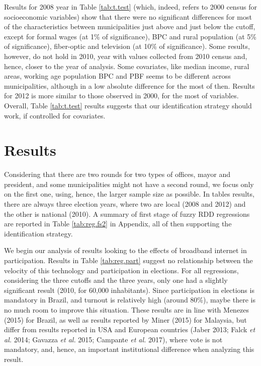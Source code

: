 \documentclass[
  12pt,
]{article}
\begin{document}
Results for 2008 year in Table \ref{tab:t.test} (which, indeed, refers
to 2000 census for socioeconomic variables) show that there were no
significant differences for most of the characteristics between
municipalities just above and just below the cutoff, except for formal
wages (at 1\% of significance), BPC and rural population (at 5\% of
significance), fiber-optic and television (at 10\% of significance).
Some results, however, do not hold in 2010, year with values collected
from 2010 census and, hence, closer to the year of analysis. Some
covariates, like median income, rural areas, working age population BPC
and PBF seems to be different across municipalities, although in a low
absolute difference for the most of then. Results for 2012 is more
similar to those observed in 2000, for the most of variables. Overall,
Table \ref{tab:t.test} results suggests that our identification strategy
should work, if controlled for covariates.

\hypertarget{results}{%
\section{Results}\label{results}}

Considering that there are two rounds for two types of offices, mayor
and president, and some municipalities might not have a second round, we
focus only on the first one, using, hence, the larger sample size as
possible. In tables results, there are always three election years,
where two are local (2008 and 2012) and the other is national (2010). A
summary of first stage of fuzzy RDD regressions are reported in Table
\ref{tab:reg.fs2} in Appendix, all of then supporting the identification
strategy.

We begin our analysis of results looking to the effects of broadband
internet in participation. Results in Table \ref{tab:reg.part} suggest
no relationship between the velocity of this technology and
participation in elections. For all regressions, considering the three
cutoffs and the three years, only one had a slightly significant result
(2010, for 60,000 inhabitants). Since participation in elections is
mandatory in Brazil, and turnout is relatively high (around 80\%), maybe
there is no much room to improve this situation. These results are in
line with Menezes (2015) for Brazil, as well as results reported by
Miner (2015) for Malaysia, but differ from results reported in USA and
European countries (Jaber 2013; Falck \emph{et al.} 2014; Gavazza
\emph{et al.} 2015; Campante \emph{et al.} 2017), where vote is not
mandatory, and, hence, an important institutional difference when
analyzing this result.
\end{document}
